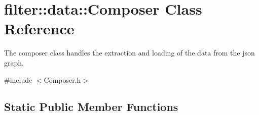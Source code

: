 \hypertarget{classfilter_1_1data_1_1_composer}{}\section{filter\+:\+:data\+:\+:Composer Class Reference}
\label{classfilter_1_1data_1_1_composer}


The composer class handles the extraction and loading of the data from the json graph.  




{\ttfamily \#include $<$Composer.\+h$>$}

\subsection*{Static Public Member Functions}
